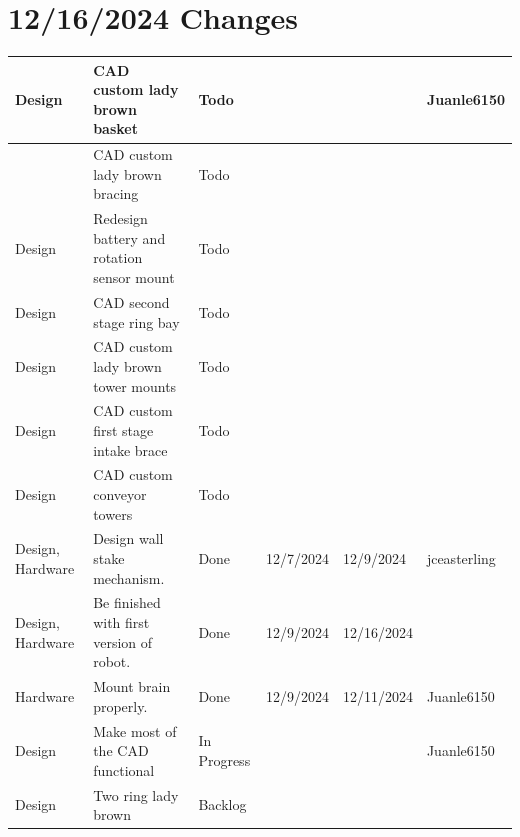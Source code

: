 \section{12/16/2024 Changes}
\begin{center}
\begin{longtable}{| p{40pt} | p{150pt} | p{35pt} | p{33pt} | p{33pt} | p{40pt} |}
\hline \rowcolor{IndianRed1}
Design & CAD custom lady brown basket & Todo &  &  & Juanle6150 \\
\hline \rowcolor{IndianRed1}
& CAD custom lady brown bracing & Todo &  &  & \\
\hline \rowcolor{IndianRed1}
Design & Redesign battery and rotation sensor mount & Todo &  &  & \\
\hline \rowcolor{IndianRed1}
Design & CAD second stage ring bay & Todo &  &  & \\
\hline \rowcolor{IndianRed1}
Design & CAD custom lady brown tower mounts & Todo &  &  & \\
\hline \rowcolor{IndianRed1}
Design & CAD custom first stage intake brace & Todo &  &  & \\
\hline \rowcolor{IndianRed1}
Design & CAD custom conveyor towers & Todo &  &  & \\
\hline \rowcolor{DarkSeaGreen1}
Design, Hardware & Design wall stake mechanism. & Done & 12/7/2024 & 12/9/2024 & jceasterling \\
\hline \rowcolor{DarkSeaGreen1}
Design, Hardware & Be finished with first version of robot. & Done & 12/9/2024 & 12/16/2024 & \\
\hline \rowcolor{DarkSeaGreen1}
Hardware & Mount brain properly. & Done & 12/9/2024 & 12/11/2024 & Juanle6150 \\
\hline \rowcolor{LightGoldenrod1}
Design & Make most of the CAD functional & In Progress &  &  & Juanle6150 \\
\hline \rowcolor{Ivory2}
Design & Two ring lady brown & Backlog &  &  & \\
\hline
\end{longtable}
\end{center}


